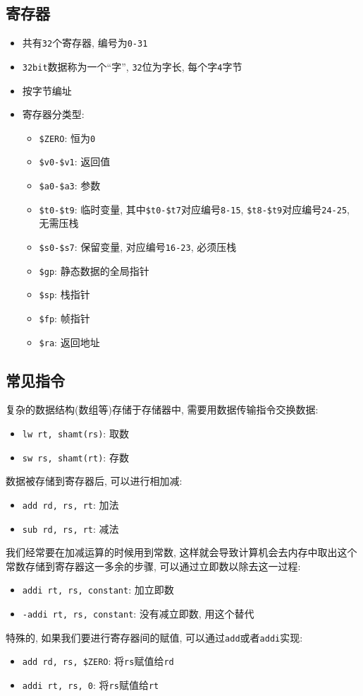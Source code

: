 \subsection{寄存器}
\begin{itemize}
\item 共有\verb|32|个寄存器, 编号为\verb|0-31|
\item \verb|32bit|数据称为一个``字'', \verb|32|位为字长, 每个字\verb|4|字节
\item 按字节编址
\item 寄存器分类型:
\begin{itemize}
\item \verb|$ZERO|: 恒为\verb|0|
\item \verb|$v0-$v1|: 返回值
\item \verb|$a0-$a3|: 参数
\item \verb|$t0-$t9|: 临时变量, 其中\verb|$t0-$t7|对应编号\verb|8-15|, \verb|$t8-$t9|对应编号\verb|24-25|, 无需压栈
\item \verb|$s0-$s7|: 保留变量, 对应编号\verb|16-23|, 必须压栈
\item \verb|$gp|: 静态数据的全局指针
\item \verb|$sp|: 栈指针
\item \verb|$fp|: 帧指针
\item \verb|$ra|: 返回地址
\end{itemize}
\end{itemize}
\subsection{常见指令}
复杂的数据结构(数组等)存储于存储器中, 需要用数据传输指令交换数据:
\begin{itemize}
\item \verb|lw rt, shamt(rs)|: 取数
\item \verb|sw rs, shamt(rt)|: 存数
\end{itemize}\par
数据被存储到寄存器后, 可以进行相加减:
\begin{itemize}
\item \verb|add rd, rs, rt|: 加法
\item \verb|sub rd, rs, rt|: 减法
\end{itemize}\par
我们经常要在加减运算的时候用到常数, 这样就会导致计算机会去内存中取出这个常数存储到寄存器这一多余的步骤, 可以通过立即数以除去这一过程:
\begin{itemize}
\item \verb|addi rt, rs, constant|: 加立即数
\item \verb|-addi rt, rs, constant|: 没有减立即数, 用这个替代
\end{itemize}\par 
特殊的, 如果我们要进行寄存器间的赋值, 可以通过\verb|add|或者\verb|addi|实现:
\begin{itemize}
\item \verb|add rd, rs, $ZERO|: 将\verb|rs|赋值给\verb|rd|
\item \verb|addi rt, rs, 0|: 将\verb|rs|赋值给\verb|rt|
\end{itemize}
